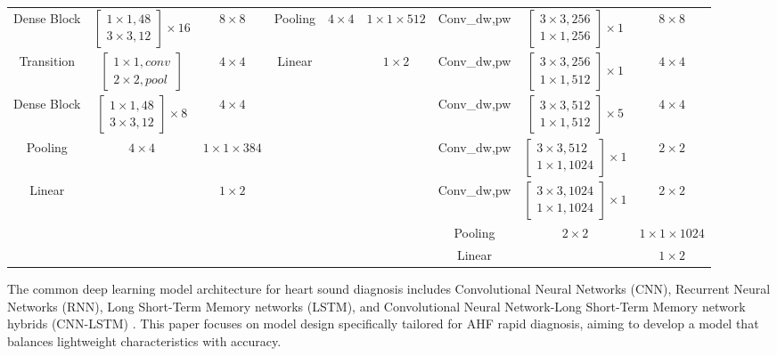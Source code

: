 \begin{table}[width=2\linewidth]
\begin{tabular*}{\tblwidth}{CCC|CCC|CCC}
Dense Block& $\begin{bmatrix}1\times1,48\\3\times3,12\end{bmatrix}\times16$ &$8\times8$&
Pooling& $4\times4$& $1\times1\times512$&
Conv\_dw,pw&$\begin{bmatrix}3\times3,256\\1\times1,256\end{bmatrix}\times1$ & $8\times8$\\
Transition& $\begin{bmatrix}1\times1,conv\\2\times2,pool\end{bmatrix}$&$4\times4$&
Linear& & $1\times2$&
Conv\_dw,pw&$\begin{bmatrix}3\times3,256\\1\times1,512\end{bmatrix}\times1$ & $4\times4$\\ 
Dense Block& $\begin{bmatrix}1\times1,48\\3\times3,12\end{bmatrix}\times8$ &$4\times4$&
&&&
Conv\_dw,pw&$\begin{bmatrix}3\times3,512\\1\times1,512\end{bmatrix}\times5$ & $4\times4$\\
Pooling& $4\times4$& $1\times1\times384$&
&&&
Conv\_dw,pw&$\begin{bmatrix}3\times3,512\\1\times1,1024\end{bmatrix}\times1$ & $2\times2$\\
Linear& & $1\times2$&
  & & &
Conv\_dw,pw&$\begin{bmatrix}3\times3,1024\\1\times1,1024\end{bmatrix}\times1$ & $2\times2$\\
&&&
  & & &
Pooling& $2\times2$& $1\times1\times1024$\\
&&&
  & & &
Linear& & $1\times2$\\
\bottomrule
\end{tabular*}
\end{table}
The common deep learning model architecture for heart sound diagnosis includes Convolutional Neural Networks (CNN), Recurrent Neural Networks (RNN), Long Short-Term Memory networks (LSTM), and Convolutional Neural Network-Long Short-Term Memory network hybrids (CNN-LSTM) \cite{rubin2016classifying,arora2021transfer,li2021lightweight,shuvo2021cardioxnet}. This paper focuses on model design specifically tailored for AHF rapid diagnosis, aiming to develop a model that balances lightweight characteristics with accuracy.

